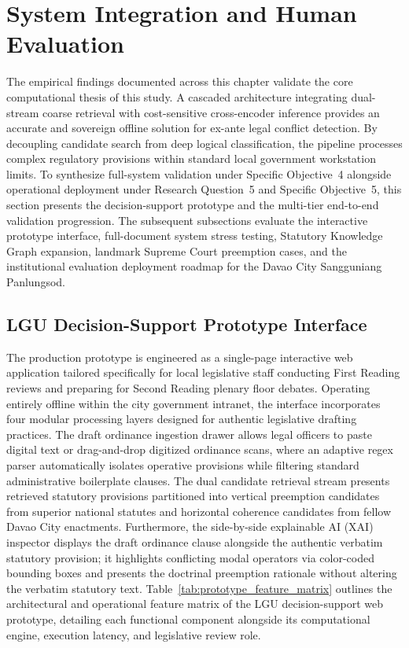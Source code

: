 \section{System Integration and Human Evaluation}
\label{sec:results_summary_roadmap}

The empirical findings documented across this chapter validate the core computational thesis of this study. A cascaded architecture integrating dual-stream coarse retrieval with cost-sensitive cross-encoder inference provides an accurate and sovereign offline solution for ex-ante legal conflict detection. By decoupling candidate search from deep logical classification, the pipeline processes complex regulatory provisions within standard local government workstation limits. To synthesize full-system validation under Specific Objective~4 alongside operational deployment under Research Question~5 and Specific Objective~5, this section presents the decision-support prototype and the multi-tier end-to-end validation progression. The subsequent subsections evaluate the interactive prototype interface, full-document system stress testing, Statutory Knowledge Graph expansion, landmark Supreme Court preemption cases, and the institutional evaluation deployment roadmap for the Davao City Sangguniang Panlungsod.


\subsection{LGU Decision-Support Prototype Interface}
\label{sec:prototype_interface_design}

The production prototype is engineered as a single-page interactive web application tailored specifically for local legislative staff conducting First Reading reviews and preparing for Second Reading plenary floor debates. Operating entirely offline within the city government intranet, the interface incorporates four modular processing layers designed for authentic legislative drafting practices. The draft ordinance ingestion drawer allows legal officers to paste digital text or drag-and-drop digitized ordinance scans, where an adaptive regex parser automatically isolates operative provisions while filtering standard administrative boilerplate clauses. The dual candidate retrieval stream presents retrieved statutory provisions partitioned into vertical preemption candidates from superior national statutes and horizontal coherence candidates from fellow Davao City enactments. Furthermore, the side-by-side explainable AI (XAI) inspector displays the draft ordinance clause alongside the authentic verbatim statutory provision; it highlights conflicting modal operators via color-coded bounding boxes and presents the doctrinal preemption rationale without altering the verbatim statutory text. Table~\ref{tab:prototype_feature_matrix} outlines the architectural and operational feature matrix of the LGU decision-support web prototype, detailing each functional component alongside its computational engine, execution latency, and legislative review role.

